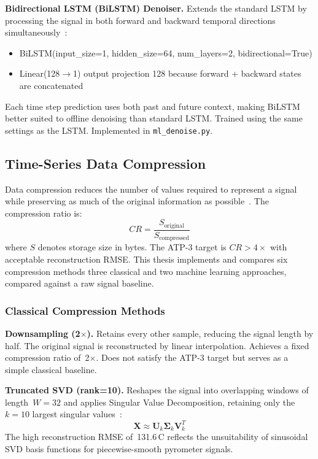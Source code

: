 \textbf{Bidirectional LSTM (BiLSTM) Denoiser.} Extends the standard LSTM by processing the signal in both forward and backward temporal directions simultaneously~\cite{hochreiter1997long}:
\begin{itemize}[nosep]
\item BiLSTM(input\_size=1, hidden\_size=64, num\_layers=2, bidirectional=True)
\item Linear(128$\to$1) output projection 128 because forward + backward states are concatenated
\end{itemize}
Each time step prediction uses both past and future context, making BiLSTM better suited to offline denoising than standard LSTM. Trained using the same settings as the LSTM. Implemented in \texttt{ml\_denoise.py}.

\subsection{Time-Series Data Compression}
\label{subsec:compression_bg}

Data compression reduces the number of values required to represent a signal while preserving as much of the original information as possible~\cite{lossless_compression}. The compression ratio is:
\begin{equation}
CR = \frac{S_{\text{original}}}{S_{\text{compressed}}}
\label{eq:cr}
\end{equation}
where $S$ denotes storage size in bytes. The ATP-3 target is $CR > 4\times$ with acceptable reconstruction RMSE. This thesis implements and compares six compression methods three classical and two machine learning approaches, compared against a raw signal baseline.

\subsubsection*{Classical Compression Methods}

\textbf{Downsampling (2$\times$).} Retains every other sample, reducing the signal length by half. The original signal is reconstructed by linear interpolation. Achieves a fixed compression ratio of~2$\times$. Does not satisfy the ATP-3 target but serves as a simple classical baseline.

\textbf{Truncated SVD (rank=10).} Reshapes the signal into overlapping windows of length~$W=32$ and applies Singular Value Decomposition, retaining only the $k=10$ largest singular values~\cite{golub2013matrix}:
\begin{equation}
\mathbf{X} \approx \mathbf{U}_k \mathbf{\Sigma}_k \mathbf{V}_k^T
\end{equation}
The high reconstruction RMSE of~131.6\,\textdegree C reflects the unsuitability of sinusoidal SVD basis functions for piecewise-smooth pyrometer signals.

